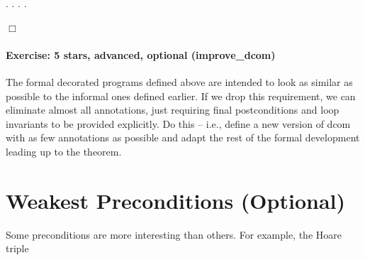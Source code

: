 \documentclass[12pt]{report}
\begin{document}
\begin{coqdoccode}
\coqdocindent{1.50em}
.\coqdoceol
\coqdocemptyline
\coqdocnoindent
{}    \coqdoceol
\coqdocindent{1.00em}
  .\coqdoceol
\coqdocnoindent
{}.\coqdoceol
 .\coqdoceol
\end{coqdoccode}
\ensuremath{\Box} 

\paragraph{Exercise: 5 stars, advanced, optional (improve\_dcom)}




    The formal decorated programs defined above are intended
    to look as similar as possible to the informal ones defined
    earlier.  If we drop this requirement, we can eliminate almost all
    annotations, just requiring final postconditions and loop
    invariants to be provided explicitly.  Do this -- i.e., define a
    new version of dcom with as few annotations as possible and adapt
    the rest of the formal development leading up to the
     theorem. 
\begin{coqdoccode}
\coqdocemptyline
\coqdocemptyline
\end{coqdoccode}
\section{Weakest Preconditions (Optional)}



 Some preconditions are more interesting than others.
    For example, the Hoare triple
\end{document}
